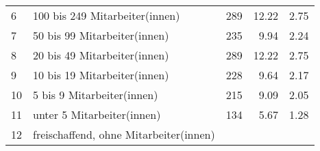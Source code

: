 \begin{longtable}{lXrrr}
     6 &
     \multicolumn{1}{X}{ 100 bis 249 Mitarbeiter(innen)   } &


       \num{289} &
       \num[round-mode=places,round-precision=2]{12,22} &
         \num[round-mode=places,round-precision=2]{2,75} \\

     7 &
     \multicolumn{1}{X}{ 50 bis 99 Mitarbeiter(innen)   } &


       \num{235} &
       \num[round-mode=places,round-precision=2]{9,94} &
         \num[round-mode=places,round-precision=2]{2,24} \\

     8 &
     \multicolumn{1}{X}{ 20 bis 49 Mitarbeiter(innen)   } &


       \num{289} &
       \num[round-mode=places,round-precision=2]{12,22} &
         \num[round-mode=places,round-precision=2]{2,75} \\

     9 &
     \multicolumn{1}{X}{ 10 bis 19 Mitarbeiter(innen)   } &


       \num{228} &
       \num[round-mode=places,round-precision=2]{9,64} &
         \num[round-mode=places,round-precision=2]{2,17} \\

     10 &
     \multicolumn{1}{X}{ 5 bis 9 Mitarbeiter(innen)   } &


       \num{215} &
       \num[round-mode=places,round-precision=2]{9,09} &
         \num[round-mode=places,round-precision=2]{2,05} \\

     11 &
     \multicolumn{1}{X}{ unter 5 Mitarbeiter(innen)   } &


       \num{134} &
       \num[round-mode=places,round-precision=2]{5,67} &
         \num[round-mode=places,round-precision=2]{1,28} \\

     12 &
     \multicolumn{1}{X}{ freischaffend, ohne Mitarbeiter(innen)   } &



\end{longtable}
